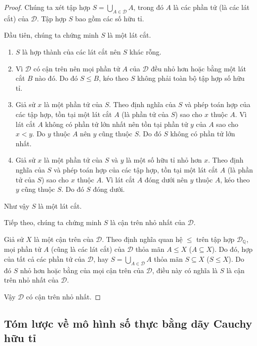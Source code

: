 \begin{proof}
	Chúng ta xét tập hợp $S = \bigcup\limits_{A\in\mathscr{D}} A$, trong đó $A$ là các phần tử (là các lát cắt) của $\mathscr{D}$. Tập hợp $S$ bao gồm các số hữu tỉ.

	Đầu tiên, chúng ta chứng minh $S$ là một lát cắt.
	\begin{enumerate}[label={(DC\arabic*)}, itemindent=0.2cm]
		\item $S$ là hợp thành của các lát cắt nên $S$ khác rỗng.
		\item Vì $\mathscr{D}$ có cận trên nên mọi phần tử $A$ của $\mathscr{D}$ đều nhỏ hơn hoặc bằng một lát cắt $B$ nào đó. Do đó $S\leq B$, kéo theo $S$ không phải toàn bộ tập hợp số hữu tỉ.
		\item Giả sử $x$ là một phần tử của $S$. Theo định nghĩa của $S$ và phép toán hợp của các tập hợp, tồn tại một lát cắt $A$ (là phần tử của $S$) sao cho $x$ thuộc $A$. Vì lát cắt $A$ không có phần tử lớn nhất nên tồn tại phần tử $y$ của $A$ sao cho $x < y$. Do $y$ thuộc $A$ nên $y$ cũng thuộc $S$. Do đó $S$ không có phần tử lớn nhất.
		\item Giả sử $x$ là một phần tử của $S$ và $y$ là một số hữu tỉ nhỏ hơn $x$.  Theo định nghĩa của $S$ và phép toán hợp của các tập hợp, tồn tại một lát cắt $A$ (là phần tử của $S$) sao cho $x$ thuộc $A$. Vì lát cắt $A$ đóng dưới nên $y$ thuộc $A$, kéo theo $y$ cũng thuộc $S$. Do đó $S$ đóng dưới.
	\end{enumerate}

	Như vậy $S$ là một lát cắt.

	Tiếp theo, chúng ta chứng minh $S$ là cận trên nhỏ nhất của $\mathscr{D}$.

	Giả sử $X$ là một cận trên của $\mathscr{D}$. Theo định nghĩa quan hệ $\leq$ trên tập hợp $\mathscr{D}_{\mathbb{Q}}$, mọi phần tử $A$ (cũng là các lát cắt) của $\mathscr{D}$ thỏa mãn $A\leq X$ ($A\subseteq X$). Do đó, hợp của tất cả các phần tử của $\mathscr{D}$, hay $S = \bigcup\limits_{A\in\mathscr{D}} A$ thỏa mãn $S\subseteq X$ ($S\leq X$). Do đó $S$ nhỏ hơn hoặc bằng của mọi cận trên của $\mathscr{D}$, điều này có nghĩa là $S$ là cận trên nhỏ nhất của $\mathscr{D}$.

	Vậy $\mathscr{D}$ có cận trên nhỏ nhất.
\end{proof}

\subsection{Tóm lược về mô hình số thực bằng dãy Cauchy hữu tỉ}

